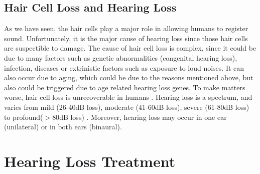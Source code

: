 \documentclass[logo,bsc,singlespacing,parskip,online]{infthesis}
\begin{document}
\newpage

\subsection{Hair Cell Loss and Hearing Loss}
As we have seen, the hair cells play a major role in allowing humans to register sound. Unfortunately,
it is the major cause of hearing loss since those hair cells are suspectible to damage.
The cause of hair cell loss is complex, since it could be due to many factors such as 
genetic abnormalities (congenital hearing loss), infection, diseases or extrinistic factors such as exposure to loud noises.
It can also occur due to aging, which could be due to the reasons mentioned above, but also 
could be triggered due to age related hearing loss genes. To make matters worse, hair cell loss is unrecoverable in humans \cite{Furness2015HairCell}.
Hearing loss is a spectrum, and varies from mild (26-40dB loss), moderate (41-60dB loss), severe (61-80dB loss) to profound($>80$dB loss) \cite{Nieman2020HearingLoss}.
Moreover, hearing loss may occur in one ear (unilateral) or in both ears (binaural). 

\section{Hearing Loss Treatment}
\end{document}
